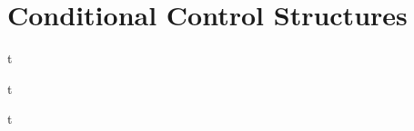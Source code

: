 \documentclass[../lecture2-variablesandcontrolstructures.tex]{subfiles}
\begin{document}
\section{Conditional Control Structures}


\begin{frame}[fragile]{}
t
\end{frame}


\begin{frame}[fragile]{}
t
\end{frame}


\begin{frame}[fragile]{}
t
\end{frame}

\end{document}
